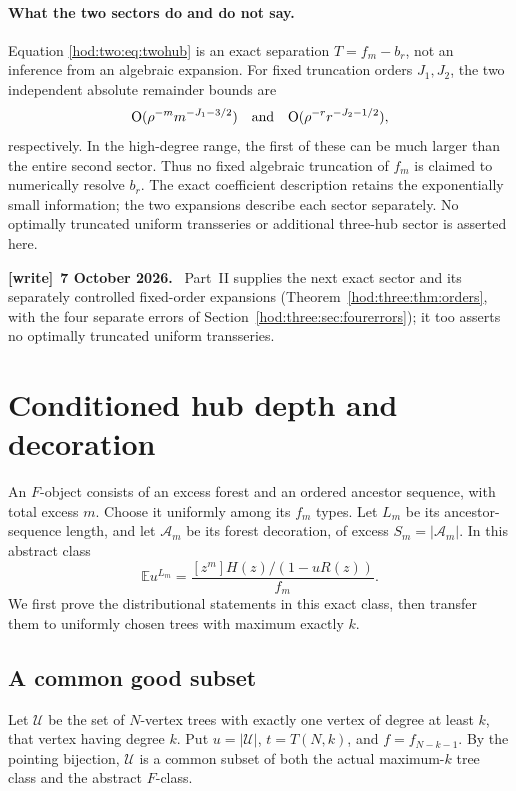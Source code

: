 \documentclass[11pt,letterpaper]{article}
\theoremstyle{definition}\newtheorem{definition}[theorem]{Definition}
\theoremstyle{remark}\newtheorem{remark}[theorem]{Remark}
\newcommand{\Ee}{\mathbb E}
\newcommand{\bigO}{\mathrm O}
\newenvironment{writenote}[1][]{\par\smallskip\begingroup\small
 \noindent\textbf{[write]}\if\relax\detokenize{#1}\relax\else~\textbf{#1.}\fi\ }%
 {\par\endgroup\smallskip}
\begin{document}
\paragraph{What the two sectors do and do not say.}
Equation \eqref{hod:two:eq:twohub} is an exact separation $T=f_m-b_r$, not an inference from an algebraic expansion. For fixed truncation orders $J_1,J_2$, the two independent absolute remainder bounds are
\[
\bigO(\rho^{-m}m^{-J_1-3/2})\quad\hbox{and}\quad
\bigO(\rho^{-r}r^{-J_2-1/2}),
\]
respectively. In the high-degree range, the first of these can be much larger than the entire second sector. Thus no fixed algebraic truncation of $f_m$ is claimed to numerically resolve $b_r$. The exact coefficient description retains the exponentially small information; the two expansions describe each sector separately. No optimally truncated uniform transseries or additional three-hub sector is asserted here.
\begin{writenote}[7 October 2026]
Part~II supplies the next exact sector and its separately controlled fixed-order
expansions (Theorem~\ref{hod:three:thm:orders}, with the four separate errors
of Section~\ref{hod:three:sec:fourerrors}); it too asserts no optimally
truncated uniform transseries.
\end{writenote}

\section{Conditioned hub depth and decoration}\label{hod:two:sec:geometry}
An $F$-object consists of an excess forest and an ordered ancestor sequence, with total excess $m$. Choose it uniformly among its $f_m$ types. Let $L_m$ be its ancestor-sequence length, and let $\mathcal A_m$ be its forest decoration, of excess $S_m=|\mathcal A_m|$. In this abstract class
\begin{equation}\label{hod:two:eq:depthpgf}
\Ee u^{L_m}=\frac{[z^m]H(z)/(1-uR(z))}{f_m}.
\end{equation}
We first prove the distributional statements in this exact class, then transfer them to uniformly chosen trees with maximum exactly $k$.

\subsection{A common good subset}
Let $\mathcal U$ be the set of $N$-vertex trees with exactly one vertex of degree at least $k$, that vertex having degree $k$. Put $u=|\mathcal U|$, $t=T(N,k)$, and $f=f_{N-k-1}$. By the pointing bijection, $\mathcal U$ is a common subset of both the actual maximum-$k$ tree class and the abstract $F$-class.
\end{document}
